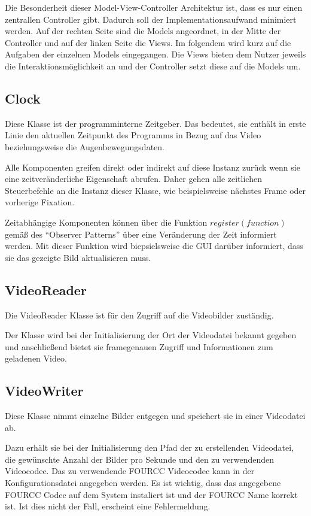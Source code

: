 \documentclass[a4paper,draft]{scrartcl}
\begin{document}
  Die Besonderheit dieser Model-View-Controller Architektur ist, dass es nur einen zentrallen Controller gibt. Dadurch soll der Implementationsaufwand minimiert werden. Auf der rechten Seite sind die Models angeordnet, in der Mitte der Controller und auf der linken Seite die Views. Im folgendem wird kurz auf die Aufgaben der einzelnen Models eingegangen. Die Views bieten dem Nutzer jeweils die Interaktionsmöglichkeit an und der Controller setzt diese auf die Models um.

\subsection{Clock}
Diese Klasse ist der programminterne Zeitgeber. 
Das bedeutet, sie enthält in erste Linie den aktuellen Zeitpunkt des Programms in Bezug auf das Video beziehungsweise die Augenbewegungsdaten.

Alle Komponenten greifen direkt oder indirekt auf diese Instanz zurück wenn sie eine zeitveränderliche Eigenschaft abrufen. Daher gehen alle zeitlichen Steuerbefehle an die Instanz dieser Klasse, wie beispielsweise nächstes Frame oder vorherige Fixation. 

Zeitabhängige Komponenten können über die Funktion $register(function)$ gemäß des "`Observer Patterns"' über eine Veränderung der Zeit informiert werden.
Mit dieser Funktion wird biepsielsweise die GUI darüber informiert, dass sie das gezeigte Bild aktualisieren muss.

\subsection{VideoReader}
Die VideoReader Klasse ist für den Zugriff auf die Videobilder zuständig.

Der Klasse wird bei der Initialisierung der Ort der Videodatei bekannt gegeben und anschließend bietet sie framegenauen Zugriff und Informationen zum geladenen Video.

\subsection{VideoWriter}
Diese Klasse nimmt einzelne Bilder entgegen und speichert sie in einer Videodatei ab.

Dazu erhält sie bei der Initialisierung den Pfad der zu erstellenden Videodatei, die gewünschte Anzahl der Bilder pro Sekunde und den zu verwendenden Videocodec.
Das zu verwendende FOURCC Videocodec kann in der Konfigurationsdatei angegeben werden. Es ist wichtig, dass das angegebene FOURCC Codec auf dem System instaliert ist und der FOURCC Name korrekt ist. Ist dies nicht der Fall, erscheint eine Fehlermeldung.
\end{document}
